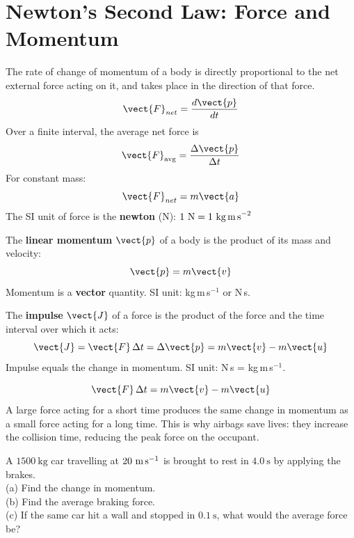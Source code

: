 \section{Newton's Second Law: Force and Momentum}

\begin{lawbox}
The rate of change of momentum of a body is directly
proportional to the net external force acting on it,
and takes place in the direction of that force.
\[
  \vect{F}_{net} = \frac{d\vect{p}}{dt}
\]
Over a finite interval, the average net force is
\[
  \vect{F}_{\mathrm{avg}} = \frac{\Delta\vect{p}}{\Delta t}
\]
For constant mass:
\[
  \vect{F}_{net} = m\vect{a}
\]
The SI unit of force is the \textbf{newton} (N):
$1\ \text{N} = 1\ \text{kg\,m\,s}^{-2}$
\end{lawbox}

\begin{definitionbox}
The \textbf{linear momentum} $\vect{p}$ of a body is
the product of its mass and velocity:
\[
  \vect{p} = m\vect{v}
\]
Momentum is a \textbf{vector} quantity. SI unit:
kg\,m\,s$^{-1}$ or N\,s.
\end{definitionbox}

\begin{definitionbox}[Impulse]
The \textbf{impulse} $\vect{J}$ of a force is the
product of the force and the time interval over which
it acts:
\[
  \vect{J} = \vect{F}\,\Delta t
  = \Delta\vect{p} = m\vect{v} - m\vect{u}
\]
Impulse equals the change in momentum.
SI unit: N\,s = kg\,m\,s$^{-1}$.
\end{definitionbox}

\begin{keybox}
\[
  \vect{F}\,\Delta t = m\vect{v} - m\vect{u}
\]
A large force acting for a short time produces the same
change in momentum as a small force acting for a long
time. This is why airbags save lives: they increase the
collision time, reducing the peak force on the occupant.
\end{keybox}

\begin{examplebox}[4.1]
A $1500\ \text{kg}$ car travelling at
$20\ \text{m\,s}^{-1}$ is brought to rest in $4.0\ \text{s}$
by applying the brakes.\\
(a) Find the change in momentum.\\
(b) Find the average braking force.\\
(c) If the same car hit a wall and stopped in $0.1\ \text{s}$,
what would the average force be?
\end{examplebox}

